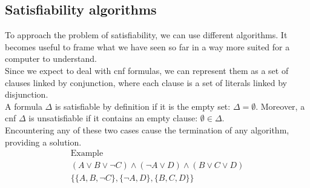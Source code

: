 \subsection{Satisfiability algorithms}

To approach the problem of satisfiability, we can use different algorithms.
It becomes useful to frame what we have seen so far in a way more suited for a computer to understand. \\
Since we expect to deal with \gls{cnf} formulas, we can represent them as a set of clauses linked by conjunction, where each clause is a set of literals linked by disjunction. \\
A formula $\Delta$ is satisfiable by definition if it is the empty set: $\Delta = \emptyset$.
Moreover, a \gls{cnf} $\Delta$ is unsatisfiable if it contains an empty clause: $\emptyset \in \Delta$. \\
Encountering any of these two cases cause the termination of any algorithm, providing a solution. \\

\begin{multline*}
    \text{Example} \\
    (A \lor B \lor \neg C) \land (\neg A \lor D) \land (B \lor C \lor D) \\
    \{ \{A, B, \neg C\}, \{\neg A, D\}, \{B, C, D\}\} \\
\end{multline*}

